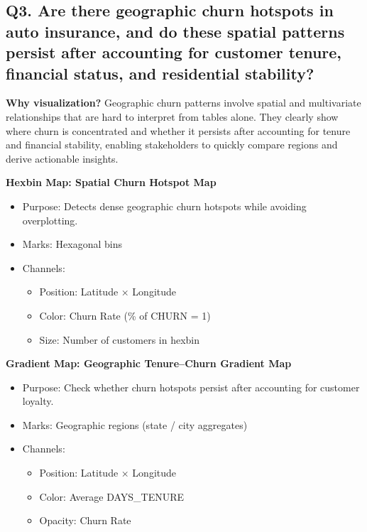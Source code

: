 \documentclass[10pt,a4paper]{article}
\begin{document}
\subsection*{Q3. Are there geographic churn hotspots in auto insurance, and do these spatial patterns persist after accounting for customer tenure, financial status, and residential stability?}

\textbf{Why visualization?} Geographic churn patterns involve spatial and multivariate relationships that are hard to interpret from tables alone. They clearly show where churn is concentrated and whether it persists after accounting for tenure and financial stability, enabling stakeholders to quickly compare regions and derive actionable insights.

\textbf{Hexbin Map: Spatial Churn Hotspot Map}
\begin{itemize}[itemsep=0pt]
    \item Purpose: Detects dense geographic churn hotspots while avoiding overplotting.
    \item Marks: Hexagonal bins
    \item Channels:
    \begin{itemize}[itemsep=0pt]
        \item Position: Latitude × Longitude
        \item Color: Churn Rate (\% of CHURN = 1)
        \item Size: Number of customers in hexbin
    \end{itemize}
\end{itemize}

\textbf{Gradient Map: Geographic Tenure–Churn Gradient Map}
\begin{itemize}[itemsep=0pt]
    \item Purpose: Check whether churn hotspots persist after accounting for customer loyalty.
    \item Marks: Geographic regions (state / city aggregates)
    \item Channels:
    \begin{itemize}[itemsep=0pt]
        \item Position: Latitude × Longitude
        \item Color: Average DAYS\_TENURE
        \item Opacity: Churn Rate
    \end{itemize}
\end{itemize}
\end{document}
